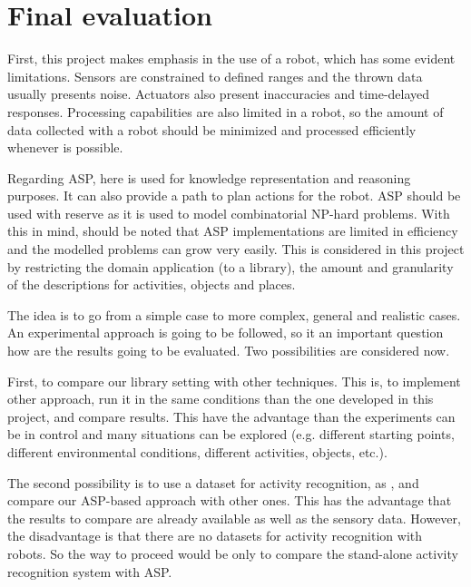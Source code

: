 






\section{Final evaluation}

First, this project makes emphasis in the use of a robot, which has some evident limitations.
Sensors are constrained to defined ranges and the thrown data usually presents noise.
Actuators also present inaccuracies and time-delayed responses.
Processing capabilities are also limited in a robot, so the amount of data collected with a robot should be minimized and processed efficiently whenever is possible.

Regarding ASP, here is used for knowledge representation and reasoning purposes. 
It can also provide a path to plan actions for the robot.
ASP should be used with reserve as it is used to model combinatorial NP-hard problems.
With this in mind, should be noted that ASP implementations are limited in efficiency and the modelled problems can grow very easily.
This is considered in this project by restricting the domain application (to a library), the amount and granularity of the descriptions for activities, objects and places. 

The idea is to go from a simple case to more complex, general and realistic cases. 
An experimental approach is going to be followed, so it an important question how are the results going to be evaluated.
Two possibilities are considered now.

First, to compare our library setting with other techniques. 
This is, to implement other approach, run it in the same conditions than the one developed in this project, and compare results.
This have the advantage than the experiments can be in control and many situations can be explored (e.g. different starting points, different environmental conditions, different activities, objects, etc.).

The second possibility is to use a dataset for activity recognition, as \citep{Tenorth2009_TUMKData}, and compare our ASP-based approach with other ones.
This has the advantage that the results to compare are already available as well as the sensory data.
However, the disadvantage is that there are no datasets for activity recognition with robots. 
So the way to proceed would be only to compare the stand-alone activity recognition system with ASP.

















